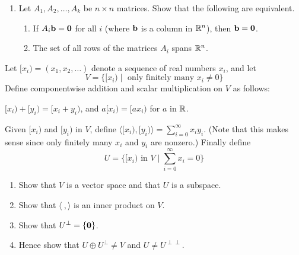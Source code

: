 \begin{multicols}{2}
\begin{ex}
\begin{enumerate}[label={\alph*.}]
\item Let $A_{1}, A_{2}, \dots, A_{k}$ be $n \times n$ matrices. Show that the following are equivalent.

\begin{enumerate}[label={\roman*.}]
\item If $A_{i}\textbf{b} = \textbf{0}$ for all $i$ (where $\textbf{b}$ is a column in $\mathbb{R}^n$), then $\textbf{b} = \textbf{0}$.

\item The set of all rows of the matrices $A_{i}$ spans $\mathbb{R}^n$.

\end{enumerate}
\end{enumerate}
\end{ex}

\begin{ex}
Let $[x_{i}) = (x_{1}, x_{2}, \dots)$ denote a sequence of real numbers $x_{i}$, and let 
\begin{equation*}
V = \{[x_{i}) \mid \mbox{ only finitely many } x_{i} \neq 0\}
\end{equation*} Define componentwise addition and scalar multiplication on $V$ as follows:

$[x_{i}) + [y_{i}) = [x_{i} + y_{i})$, and $a[x_{i}) = [ax_{i})$ for $a$ in $\mathbb{R}$.


\noindent Given $[x_{i})$ and $[y_{i})$ in $V$, define $ \langle [x_i), [y_i) \rangle = \displaystyle \sum_{i = 0}^{\infty} x_i y_i $. (Note that this makes sense since only finitely many $x_{i}$ and $y_{i}$ are nonzero.) Finally define 
\begin{equation*}
U = \{[x_i) \mbox{ in } V \mid \displaystyle \sum_{i = 0}^{\infty} x_i = 0 \}
\end{equation*}

\begin{enumerate}[label={\alph*.}]
\item Show that $V$ is a vector space and that $U$ is a subspace.

\item Show that $\langle\ , \rangle$ is an inner product on $V$.

\item Show that $U^{\perp} = \{\textbf{0}\}$.

\item Hence show that $U \oplus U^{\perp} \neq V$ and $U \neq U^{\perp\perp}$.

\end{enumerate}
\end{ex}
\end{multicols}
